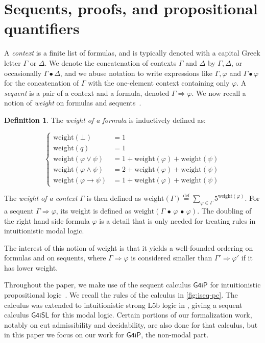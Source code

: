 \documentclass[english,review]{jflart}
\theoremstyle{definition}
\newtheorem{definition}{Definition}
\theoremstyle{plain}
\renewcommand{\phi}{\varphi}
\newcommand{\weight}{\text{weight}}
\newcommand{\Gfourip}{\mathsf{G4iP}}
\newcommand{\Gfourisl}{\mathsf{G4iSL}}
\newcommand{\isdef}{\stackrel{\mathrm{def}}{=}}
\newcommand{\cons}{\,\bullet\,}
\begin{document}
\section{Sequents, proofs, and propositional quantifiers}\label{sec:prelims}
A \emph{context} is a finite list of formulas, and is typically denoted with a capital Greek letter $\Gamma$ or $\Delta$. We denote the concatenation of contexts $\Gamma$ and $\Delta$ by $\Gamma, \Delta$, or occasionally $\Gamma \bullet \Delta$, and we abuse notation to write expressions like $\Gamma, \phi$ and $\Gamma \bullet \phi$ for the concatenation of $\Gamma$ with the one-element context containing only $\phi$. A \emph{sequent} is a pair of a context and a formula, denoted $\Gamma \Rightarrow \phi$. We now recall a notion of \emph{weight} on formulas and sequents~\cite{Pit1992}.
\begin{definition}\label{dfn:weight}
    The \emph{weight of a formula} is inductively defined as:

$$\left\{
\begin{array}{rl}
      \weight(\bot) &= 1 \\
      \weight(q) &= 1 \\
      \weight(\phi \lor \psi) &= 1 + \weight (\phi) + \weight (\psi) \\
      \weight(\phi \land \psi) &= 2 + \weight (\phi) + \weight (\psi) \\
      \weight(\phi \rightarrow \psi) &= 1 + \weight (\phi) + \weight (\psi)
\end{array}
\right.$$

The \emph{weight of a context} $\Gamma$ is then defined as $\weight(\Gamma) \isdef \sum_{\phi \in \Gamma} 5^{\weight(\phi)}$. For a sequent $\Gamma \Rightarrow \phi$, its weight is defined as $\weight(\Gamma \cons \phi \cons \phi)$. The doubling of the right hand side formula $\phi$ is a detail that is only needed for treating rules in intuitionistic modal logic.
\end{definition}
The interest of this notion of weight is that it yields a well-founded ordering on formulas and on sequents, where $\Gamma \Rightarrow \phi$ is considered smaller than $\Gamma' \Rightarrow \phi'$ if it has lower weight.

Throughout the paper, we make use of the sequent calculus $\Gfourip$ for intuitionistic propositional logic~\cite{Vor1952,Hud1988,Dyc1992}. We recall the rules of the calculus in \cref{fig:iseq-pc}. The calculus was extended to intuitionistic strong Löb logic in \cite{Shillito23}, giving a sequent calculus $\Gfourisl$ for this modal logic. Certain portions of our formalization work, notably on cut admissibility and decidability, are also done for that calculus, but in this paper we focus on our work for $\Gfourip$, the non-modal part.
\end{document}
